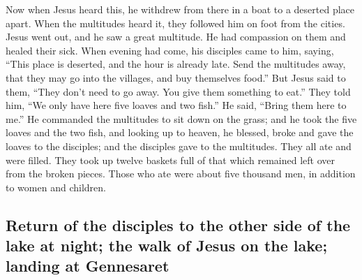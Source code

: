  Now when Jesus heard this, he withdrew from there in a
boat to a deserted place apart. When the multitudes heard it, they
followed him on foot from the cities.  Jesus went out,
and he saw a great multitude. He had compassion on them and healed their
sick.  When evening had come, his disciples came to him,
saying, ``This place is deserted, and the hour is already late. Send the
multitudes away, that they may go into the villages, and buy themselves
food.''  But Jesus said to them, ``They don't need to go
away. You give them something to eat.''  They told him,
``We only have here five loaves and two fish.''  He said,
``Bring them here to me.''  He commanded the multitudes
to sit down on the grass; and he took the five loaves and the two fish,
and looking up to heaven, he blessed, broke and gave the loaves to the
disciples; and the disciples gave to the multitudes. 
They all ate and were filled. They took up twelve baskets full of that
which remained left over from the broken pieces.  Those
who ate were about five thousand men, in addition to women and children.

\hypertarget{return-of-the-disciples-to-the-other-side-of-the-lake-at-night-the-walk-of-jesus-on-the-lake-landing-at-gennesaret}{%
\subsection{Return of the disciples to the other side of the lake at
night; the walk of Jesus on the lake; landing at
Gennesaret}\label{return-of-the-disciples-to-the-other-side-of-the-lake-at-night-the-walk-of-jesus-on-the-lake-landing-at-gennesaret}}

